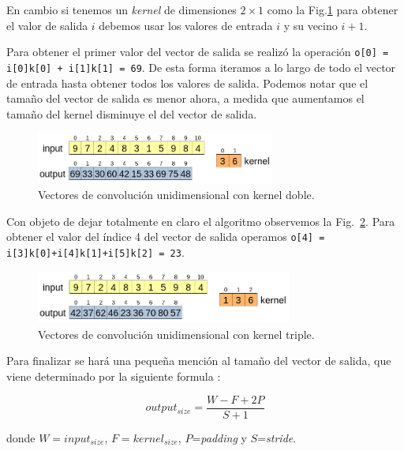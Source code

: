 \documentclass[a4paper,12pt]{article}
\begin{document}
En cambio si tenemos un \textit{kernel} de dimensiones $2 \times 1$ como la Fig.\ref{fig:conv1dk2} para obtener el valor de salida $i$ debemos usar los valores de entrada $i$ y su vecino $i+1$.

Para obtener el primer valor del vector de salida se realizó la operación \texttt{o[0] = i[0]k[0] + i[1]k[1] = 69}. De esta forma iteramos a lo largo de todo el vector de entrada hasta obtener todos los valores de salida. Podemos notar que el tamaño del vector de salida es menor ahora, a medida que aumentamos el tamaño del kernel disminuye el del vector de salida.

\begin{figure}[H]
	\begin{center}				
	\includegraphics[width=0.7\textwidth]{tesis_25.png}
  	\caption{Vectores de convolución unidimensional con kernel doble.}
  	\label{fig:conv1dk2}
  	\end{center}
\end{figure}

Con objeto de dejar totalmente en claro el algoritmo observemos la Fig.~\ref{fig:conv1dk3}. Para obtener el valor del índice 4 del vector de salida operamos \texttt{o[4] = i[3]k[0]+i[4]k[1]+i[5]k[2] = 23}.

\begin{figure}[H]
	\begin{center}				
	\includegraphics[width=0.75\textwidth]{tesis_26.png}
  	\caption{Vectores de convolución unidimensional con kernel triple.}
  	\label{fig:conv1dk3}
  	\end{center}
\end{figure}

Para finalizar se hará una pequeña mención al tamaño del vector de salida, que viene determinado por la siguiente formula \citep{SOOutputConv}:

$$ output_{size} = \frac{W-F+2P}{S+1}$$

donde $W = input_{size}$, $F=kernel_{size}$, $P$=\textit{padding} y $S$=\textit{stride}.
\end{document}
